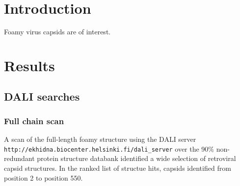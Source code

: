 \section{Introduction}
Foamy virus capsids are of interest.

\section{Results}

\subsection{DALI searches}

\subsubsection{Full chain scan}

A scan of the full-length foamy structure using the DALI server
{\tt http://ekhidna.biocenter.helsinki.fi/dali_server}
over the 90\% non-redundant protein structure databank
identified a wide selection of retroviral capsid structures.  In the ranked list of structue hits,
capsids identified from position 2 to position 550.


